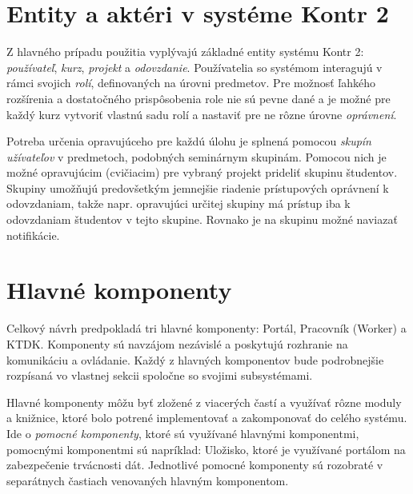 \documentclass[
  digital, %
  twoside, %
  table,   %
  lof,     %
  lot,     %
]{fithesis3}
\begin{document}

\section{Entity a aktéri v systéme Kontr 2}

Z hlavného prípadu použitia vyplývajú základné entity systému Kontr 2: \emph{používateľ}, \emph{kurz}, \emph{projekt} a \emph{odovzdanie}. Používatelia so systémom interagujú v rámci svojich \emph{rolí}, definovaných na úrovni predmetov. Pre možnosť ľahkého rozšírenia a dostatočného prispôsobenia role nie sú pevne dané a je možné pre každý kurz vytvoriť vlastnú sadu rolí a nastaviť pre ne rôzne úrovne \emph{oprávnení}.

Potreba určenia opravujúceho pre každú úlohu je splnená pomocou \emph{skupín užívateľov} v predmetoch, podobných seminárnym skupinám. Pomocou nich je možné opravujúcim (cvičiacim) pre vybraný projekt prideliť skupinu študentov. Skupiny umožňujú predovšetkým jemnejšie riadenie prístupových oprávnení k odovzdaniam, takže napr. opravujúci určitej skupiny má prístup iba k odovzdaniam študentov v tejto skupine. Rovnako je na skupinu možné naviazať notifikácie.


\section{Hlavné komponenty}

Celkový návrh predpokladá tri hlavné komponenty: Portál, Pracovník (Worker) a KTDK. Komponenty sú navzájom nezávislé a poskytujú rozhranie na komunikáciu a ovládanie. Každý z hlavných komponentov bude podrobnejšie rozpísaná vo vlastnej sekcii spoločne so svojimi subsystémami.

Hlavné komponenty môžu byť zložené z viacerých častí a využívať rôzne moduly a knižnice, ktoré bolo potrené implementovať a zakomponovať do celého systému.
Ide o \emph{pomocné komponenty}, ktoré sú využívané hlavnými komponentmi, pomocnými komponentmi sú napríklad: Uložisko, ktoré je využívané portálom na zabezpečenie trvácnosti dát. Jednotlivé pomocné komponenty sú rozobraté v separátnych častiach venovaných hlavným komponentom.
\end{document}
